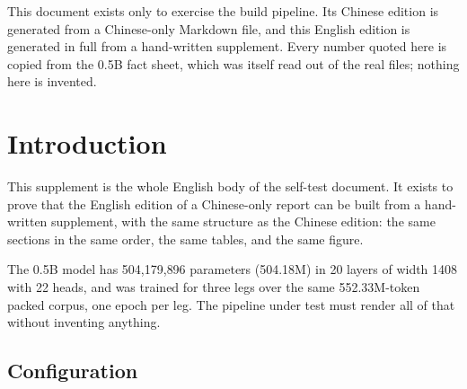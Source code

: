 \documentclass[11pt,openany]{article}
\begin{document}
This document exists only to exercise the build pipeline. Its Chinese edition is generated
from a Chinese-only Markdown file, and this English edition is generated in full from a
hand-written supplement. Every number quoted here is copied from the 0.5B fact sheet, which
was itself read out of the real  files; nothing here is invented.

\clearpage

\renewcommand{\contentsname}{Contents}
\tableofcontents

\clearpage


%

\section{Introduction}

This supplement is the whole English body of the self-test document. It exists to prove that
the English edition of a Chinese-only report can be built from a hand-written supplement, with
the same structure as the Chinese edition: the same sections in the same order, the same
tables, and the same figure.

The 0.5B model has 504{,}179{,}896 parameters (504.18M) in 20 layers of width 1408 with 22
heads, and was trained for three legs over the same 552.33M-token packed corpus, one epoch per
leg. The pipeline under test must render all of that without inventing anything.

\subsection{Configuration}
\end{document}
